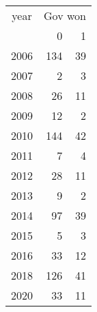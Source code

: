 \footnotesize\begin{tabular}[t]{lrr}
\toprule
\multicolumn{1}{c}{year} & \multicolumn{2}{c}{Gov won} \\
\cmidrule(l{3pt}r{3pt}){1-1} \cmidrule(l{3pt}r{3pt}){2-3}
  & 0 & 1\\
\midrule
2006 & 134 & 39\\
2007 & 2 & 3\\
2008 & 26 & 11\\
2009 & 12 & 2\\
2010 & 144 & 42\\
2011 & 7 & 4\\
2012 & 28 & 11\\
2013 & 9 & 2\\
2014 & 97 & 39\\
2015 & 5 & 3\\
2016 & 33 & 12\\
2018 & 126 & 41\\
2020 & 33 & 11\\
\bottomrule
\end{tabular}
